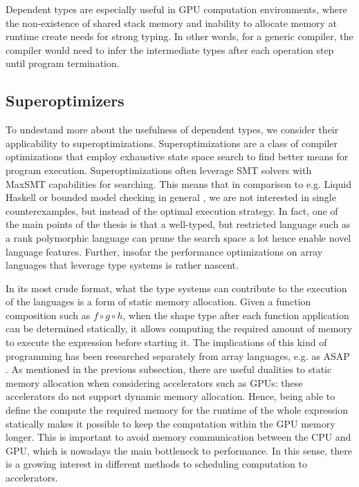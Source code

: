 \documentclass[10pt,a4paper]{article}
\begin{document}
Dependent types are especially useful in GPU computation environments, where the non-existence of shared stack memory and inability to allocate memory at runtime create needs for strong typing.
In other words, for a generic compiler, the compiler would need to infer the intermediate types after each operation step until program termination.

\subsection{Superoptimizers}

To undestand more about the usefulness of dependent types, we consider their applicability to superoptimizations.
Superoptimizations are a class of compiler optimizations that employ exhaustive state space search to find better means for program execution.
Superoptimizations often leverage SMT solvers with MaxSMT capabilities for searching.
This means that in comparison to e.g. Liquid Haskell \cite{LiquidateYourHandle2020} or bounded model checking in general \cite{Alive2BoundedLopes2021}, we are not interested in single counterexamples, but instead of the optimal execution strategy.
In fact, one of the main points of the thesis is that a well-typed, but restricted language such as a rank polymorphic language can prune the search space a lot hence enable novel language features.
Further, insofar the performance optimizations on array languages that leverage type systems is rather nascent.

In its most crude format, what the type systems can contribute to the execution of the languages is a form of static memory allocation.
Given a function composition such as $f \circ g \circ h$, when the shape type after each function application can be determined statically, it allows computing the required amount of memory to execute the expression before starting it.
The implications of this kind of programming has been researched separately from array languages, e.g. as ASAP  \cite{AsapAsStaticProust2017}.
As mentioned in the previous subsection, there are useful dualities to static memory allocation when considering accelerators such as GPUs: these accelerators do not support dynamic memory allocation.
Hence, being able to define the compute the required memory for the runtime of the whole expression statically makes it possible to keep the computation within the GPU memory longer.
This is important to avoid memory communication between the CPU and GPU, which is nowadays the main bottleneck to performance.
In this sense, there is a growing interest in different methods to scheduling computation to accelerators.
\end{document}
